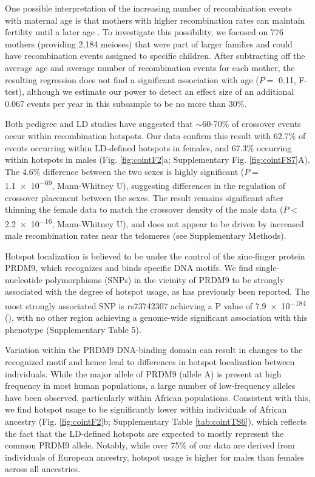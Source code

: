 One possible interpretation of the increasing number of
recombination events with maternal age is that mothers with
higher recombination rates can maintain fertility until a later
age\cite{Kong2004} . To investigate this possibility, we focused on 776 mothers
(providing 2,184 meioses) that were part of larger families and
could have recombination events assigned to specific children.
After subtracting off the average age and average number of
recombination events for each mother, the resulting regression
does not find a significant association with age ($P=$ 0.11, F-test),
although we estimate our power to detect an effect size of an
additional 0.067 events per year in this subsample to be no more
than 30\%.

Both pedigree and LD studies have suggested that $\sim$60-70\% of
crossover events occur within recombination hotspots\cite{Coop2008,Myers2005}. Our
data confirm this result with 62.7\% of events occurring within
LD-defined hotspots in females, and 67.3\% occurring within
hotspots in males (Fig. \ref{fig:cointF2}a; Supplementary Fig. \ref{fig:cointFS7}A). The 4.6\%
difference between the two sexes is highly significant
($P=$ \num{1.1e-69}, Mann-Whitney U), suggesting differences in
the regulation of crossover placement between the sexes. The
result remains significant after thinning the female data to match
the crossover density of the male data ($P<$ \num{2.2e-16},
Mann-Whitney U), and does not appear to be driven by
increased male recombination rates near the telomeres (see
Supplementary Methods).

Hotspot localization is believed to be under the control of the
zinc-finger protein PRDM9, which recognizes and binds specific
DNA motifs\cite{Berg2010,Berg2011,Hinch2011,Parvanov2010}. We find single-nucleotide polymorphisms
(SNPs) in the vicinity of PRDM9 to be strongly associated with
the degree of hotspot usage, as has previously been reported\cite{Kong2014,Hinch2011}.
The most strongly associated SNP is rs73742307 achieving a
P value of \num{7.9e-184} (\citet{Reynolds2013}), with no other region achieving a
genome-wide significant association with this phenotype
(Supplementary Table 5).

Variation within the PRDM9 DNA-binding domain can result
in changes to the recognized motif and hence lead to differences
in hotspot localization between individuals. While the major allele
of PRDM9 (allele A) is present at high frequency in most human
populations, a large number of low-frequency alleles have been
observed, particularly within African populations\cite{Berg2011,Parvanov2010}. Consistent
with this, we find hotspot usage to be significantly lower within
individuals of African ancestry (Fig. \ref{fig:cointF2}b; Supplementary Table \ref{tab:cointTS6}),
which reflects the fact that the LD-defined hotspots are expected
to mostly represent the common PRDM9 allele. Notably, while
over 75\% of our data are derived from individuals of European
ancestry, hotspot usage is higher for males than females across all
ancestries.

